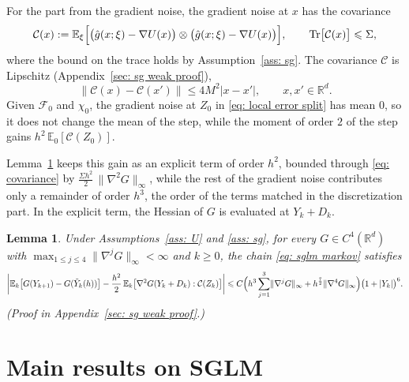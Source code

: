 \documentclass{article}
\newtheorem{lemma}{Lemma}
\newcommand{\Le}{\leqslant}
\newcommand{\Ge}{\geqslant}
\newcommand{\norm}[1]{\lVert #1 \rVert}
\numberwithin{equation}{section}
\begin{document}
For the part from the gradient noise, the gradient noise at $x$ has the covariance
\begin{equation}
    \mathcal C(x) := \mathbb E_\xi\Bigl[ \bigl( \hat g(x;\xi) - \nabla U(x) \bigr) \otimes \bigl( \hat g(x;\xi) - \nabla U(x) \bigr) \Bigr] , \qquad \mathrm{Tr}\bigl[ \mathcal C(x) \bigr] \Le \Sigma ,
    \label{eq: covariance}
\end{equation}
where the bound on the trace holds by Assumption~\ref{ass: sg}. The covariance $\mathcal C$ is Lipschitz (Appendix~\ref{sec: sg weak proof}),
\begin{equation}
    \norm{\mathcal C(x) - \mathcal C(x')} \Le 4 M^2 |x - x'| , \qquad x, x' \in \mathbb R^d .
    \label{eq: covariance lipschitz}
\end{equation}
Given $\mathcal F_0$ and $\chi_0$, the gradient noise at $Z_0$ in \eqref{eq: local error split} has mean $0$, so it does not change the mean of the step, while the moment of order $2$ of the step gains $h^2\, \mathbb E_0[\mathcal C(Z_0)]$.

Lemma~\ref{lem: sg weak} keeps this gain as an explicit term of order $h^2$, bounded through \eqref{eq: covariance} by $\frac{\Sigma h^2}{2}\, \norm{\nabla^2 G}_\infty$, while the rest of the gradient noise contributes only a remainder of order $h^3$, the order of the terms matched in the discretization part. In the explicit term, the Hessian of $G$ is evaluated at $Y_k + D_k$.

\begin{lemma}
\label{lem: sg weak}
    Under Assumptions~\ref{ass: U} and \ref{ass: sg}, for every $G \in C^4(\mathbb R^d)$ with $\max_{1 \Le j \Le 4} \norm{\nabla^j G}_\infty < \infty$ and $k \Ge 0$, the chain \eqref{eq: sglm markov} satisfies
    \begin{equation}
        \biggl| \mathbb E_k \bigl[ G(Y_{k+1}) - G(\tilde Y_k(h)) \bigr] - \frac{h^2}{2}\, \mathbb E_k\bigl[ \nabla^2 G(Y_k + D_k) : \mathcal C(Z_k) \bigr] \biggr|
        \Le C \Bigl( h^3 \sum_{j=1}^{3} \norm{\nabla^j G}_\infty + h^{\frac72} \norm{\nabla^4 G}_\infty \Bigr) \bigl( 1 + |Y_k| \bigr)^{6} .
    \label{eq: sg weak}
    \end{equation}
    \emph{(Proof in Appendix~\ref{sec: sg weak proof}.)}
\end{lemma}

\section{Main results on SGLM}
\label{sec: mse}
\end{document}
